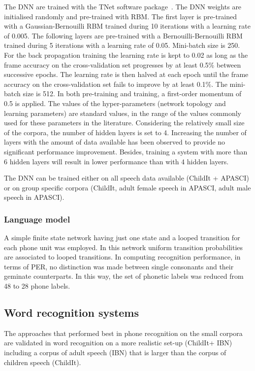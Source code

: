 \documentclass{nle}
\begin{document}
The DNN are trained with the TNet software package~\citep*{vesely10}. The DNN weights are initialised randomly and pre-trained with RBM. The first layer is pre-trained with a Gaussian-Bernouilli RBM trained during 10 iterations with a learning rate of 0.005. The following layers are pre-trained with a Bernouilli-Bernouilli RBM trained during 5 iterations with a learning rate of 0.05. Mini-batch size is 250. For the back propagation training the learning rate is kept to 0.02 as long as the frame accuracy on the cross-validation set progresses by at least 0.5\% between successive epochs. The learning rate is then halved at each epoch until the frame accuracy on the cross-validation set fails to improve by at least 0.1\%. The mini-batch size is 512. In both pre-training and training, a first-order momentum of 0.5 is applied. The values of the hyper-parameters (network topology and learning parameters) are standard values, in the range of the values commonly used for these parameters in the literature. Considering the relatively small size of the corpora, the number of hidden layers is set to 4. Increasing the number of layers with the amount of data available has been observed to provide no significant performance improvement. Besides, training a system with more than 6 hidden layers will result in lower performance than with 4 hidden layers.

The DNN can be trained either on all speech data available  (ChildIt + APASCI) or on group specific corpora (ChildIt, adult female speech in APASCI, adult male speech in APASCI).

\subsubsection{Language model}
A simple finite state network having  just one state and a  looped transition for each
phone  unit   was  employed.   In  this   network  uniform  transition
probabilities  are  associated to  looped  transitions.  In  computing
recognition  performance,  in terms  of  PER,  no
distinction  was made  between  single consonants  and their  geminate
counterparts.  In this way, the  set of phonetic labels was reduced
from 48 to 28 phone labels.  



\subsection{Word recognition systems}
The approaches that performed best in phone recognition on the small corpora are validated in word recognition on a more realistic set-up (ChildIt+ IBN) including a corpus of adult speech (IBN) that is larger than the corpus of children speech (ChildIt).
\end{document}
